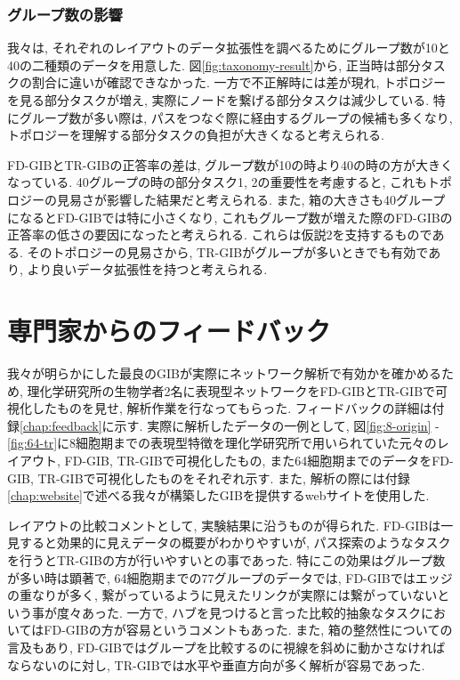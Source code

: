 \documentclass{kuee}
\begin{document}

\subsection{グループ数の影響}
我々は, それぞれのレイアウトのデータ拡張性を調べるためにグループ数が10と40の二種類のデータを用意した.
図\ref{fig:taxonomy-result}から, 正当時は部分タスクの割合に違いが確認できなかった.
一方で不正解時には差が現れ, トポロジーを見る部分タスクが増え, 実際にノードを繋げる部分タスクは減少している.
特にグループ数が多い際は, パスをつなぐ際に経由するグループの候補も多くなり, トポロジーを理解する部分タスクの負担が大きくなると考えられる.

FD-GIBとTR-GIBの正答率の差は, グループ数が10の時より40の時の方が大きくなっている.
40グループの時の部分タスク1, 2の重要性を考慮すると, これもトポロジーの見易さが影響した結果だと考えられる.
また, 箱の大きさも40グループになるとFD-GIBでは特に小さくなり, これもグループ数が増えた際のFD-GIBの正答率の低さの要因になったと考えられる.
これらは仮説2を支持するものである.
そのトポロジーの見易さから, TR-GIBがグループが多いときでも有効であり, より良いデータ拡張性を持つと考えられる.

\chapter{専門家からのフィードバック}
我々が明らかにした最良のGIBが実際にネットワーク解析で有効かを確かめるため, 理化学研究所の生物学者2名に表現型ネットワークをFD-GIBとTR-GIBで可視化したものを見せ, 解析作業を行なってもらった.
フィードバックの詳細は付録\ref{chap:feedback}に示す.
実際に解析したデータの一例として, 図\ref{fig:8-origin} - \ref{fig:64-tr}に8細胞期までの表現型特徴を理化学研究所で用いられていた元々のレイアウト, FD-GIB, TR-GIBで可視化したもの, また64細胞期までのデータをFD-GIB, TR-GIBで可視化したものをそれぞれ示す.
また, 解析の際には付録\ref{chap:website}で述べる我々が構築したGIBを提供するwebサイトを使用した.

レイアウトの比較コメントとして, 実験結果に沿うものが得られた.
FD-GIBは一見すると効果的に見えデータの概要がわかりやすいが, パス探索のようなタスクを行うとTR-GIBの方が行いやすいとの事であった.
特にこの効果はグループ数が多い時は顕著で, 64細胞期までの77グループのデータでは, FD-GIBではエッジの重なりが多く, 繋がっているように見えたリンクが実際には繋がっていないという事が度々あった.
一方で, ハブを見つけると言った比較的抽象なタスクにおいてはFD-GIBの方が容易というコメントもあった.
また, 箱の整然性についての言及もあり, FD-GIBではグループを比較するのに視線を斜めに動かさなければならないのに対し, TR-GIBでは水平や垂直方向が多く解析が容易であった.
\end{document}
